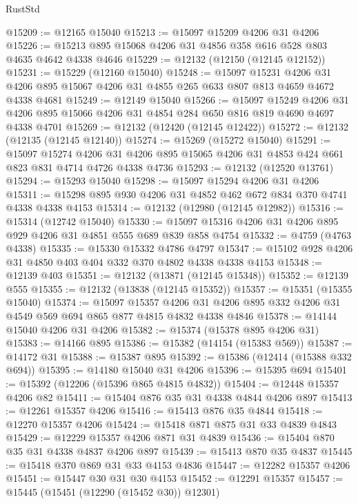 \begin{lexlean}{RustStd}
\begin{coremodule}
@15209 := @12165 @15040
@15213 := @15097 @15209 @4206 @31 @4206
@15226 := @15213 @895 @15068 @4206 @31 @4856 @358 @616 @528 @803 @4635 @4642 @4338 @4646
@15229 := @12132 (@12150 (@12145 @12152))
@15231 := @15229 (@12160 @15040)
@15248 := @15097
    @15231
    @4206
    @31
    @4206
    @895
    @15067
    @4206
    @31
    @4855
    @265
    @633
    @807
    @813
    @4659
    @4672
    @4338
    @4681
@15249 := @12149 @15040
@15266 := @15097
    @15249
    @4206
    @31
    @4206
    @895
    @15066
    @4206
    @31
    @4854
    @284
    @650
    @816
    @819
    @4690
    @4697
    @4338
    @4701
@15269 := @12132 (@12420 (@12145 @12422))
@15272 := @12132 (@12135 (@12145 @12140))
@15274 := @15269 (@15272 @15040)
@15291 := @15097
    @15274
    @4206
    @31
    @4206
    @895
    @15065
    @4206
    @31
    @4853
    @424
    @661
    @823
    @831
    @4714
    @4726
    @4338
    @4736
@15293 := @12132 (@12520 @13761)
@15294 := @15293 @15040
@15298 := @15097 @15294 @4206 @31 @4206
@15311 := @15298 @895 @930 @4206 @31 @4852 @462 @672 @834 @370 @4741 @4338 @4338 @4153
@15314 := @12132 (@12980 (@12145 @12982))
@15316 := @15314 (@12742 @15040)
@15330 := @15097 @15316 @4206 @31 @4206 @895 @929 @4206 @31 @4851 @555 @689 @839 @858 @4754
@15332 := @4759 (@4763 @4338)
@15335 := @15330 @15332 @4786 @4797
@15347 := @15102 @928 @4206 @31 @4850 @403 @404 @332 @370 @4802 @4338 @4338 @4153
@15348 := @12139 @403
@15351 := @12132 (@13871 (@12145 @15348))
@15352 := @12139 @555
@15355 := @12132 (@13838 (@12145 @15352))
@15357 := @15351 (@15355 @15040)
@15374 := @15097
    @15357
    @4206
    @31
    @4206
    @895
    @332
    @4206
    @31
    @4549
    @569
    @694
    @865
    @877
    @4815
    @4832
    @4338
    @4846
@15378 := @14144 @15040 @4206 @31 @4206
@15382 := @15374 (@15378 @895 @4206 @31)
@15383 := @14166 @895
@15386 := @15382 (@14154 (@15383 @569))
@15387 := @14172 @31
@15388 := @15387 @895
@15392 := @15386 (@12414 (@15388 @332 @694))
@15395 := @14180 @15040 @31 @4206
@15396 := @15395 @694
@15401 := @15392 (@12206 (@15396 @865 @4815 @4832))
@15404 := @12448 @15357 @4206 @82
@15411 := @15404 @876 @35 @31 @4338 @4844 @4206 @897
@15413 := @12261 @15357 @4206
@15416 := @15413 @876 @35 @4844
@15418 := @12270 @15357 @4206
@15424 := @15418 @871 @875 @31 @33 @4839 @4843
@15429 := @12229 @15357 @4206 @871 @31 @4839
@15436 := @15404 @870 @35 @31 @4338 @4837 @4206 @897
@15439 := @15413 @870 @35 @4837
@15445 := @15418 @370 @869 @31 @33 @4153 @4836
@15447 := @12282 @15357 @4206
@15451 := @15447 @30 @31 @30 @4153
@15452 := @12291 @15357
@15457 := @15445 (@15451 (@12290 (@15452 @30)) @12301)

\end{coremodule}
\end{lexlean}
